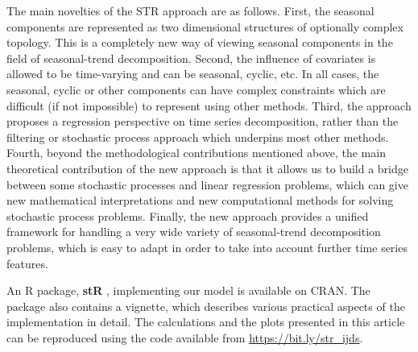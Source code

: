\documentclass[11pt,a4paper,]{article}
\begin{document}
The main novelties of the STR approach are as follows. First, the seasonal components are represented as two dimensional structures of optionally complex topology. This is a completely new way of viewing seasonal components in the field of seasonal-trend decomposition. Second, the influence of covariates is allowed to be time-varying and can be seasonal, cyclic, etc. In all cases, the seasonal, cyclic or other components can have complex constraints which are difficult (if not impossible) to represent using other methods. Third, the approach proposes a regression perspective on time series decomposition, rather than the filtering or stochastic process approach which underpins most other methods. Fourth, beyond the methodological contributions mentioned above, the main theoretical contribution of the new approach is that it allows us to build a bridge between some stochastic processes and linear regression problems, which can give new mathematical interpretations and new computational methods for solving stochastic process problems. Finally, the new approach provides a unified framework for handling a very wide variety of seasonal-trend decomposition problems, which is easy to adapt in order to take into account further time series features.

An R package, \textbf{stR} \autocite{stR}, implementing our model is available on CRAN.
The package also contains a vignette, which describes various practical aspects of the implementation in detail. The calculations and the plots presented in this article can be reproduced using the code available from \url{https://bit.ly/str_ijds}.

\newpage

\printbibliography
\end{document}
